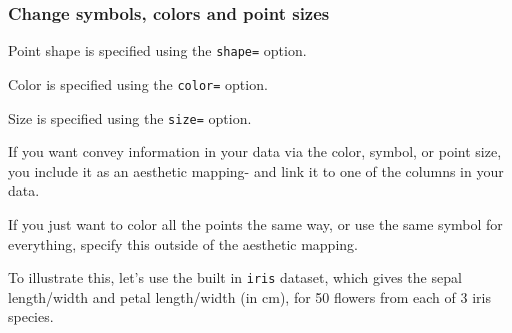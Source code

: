 \documentclass[
]{article}
\begin{document}
\hypertarget{change-symbols-colors-and-point-sizes}{%
\subsubsection{Change symbols, colors and point
sizes}\label{change-symbols-colors-and-point-sizes}}

Point shape is specified using the \texttt{shape=} option.

Color is specified using the \texttt{color=} option.

Size is specified using the \texttt{size=} option.

If you want convey information in your data via the color, symbol, or
point size, you include it as an aesthetic mapping- and link it to one
of the columns in your data.

If you just want to color all the points the same way, or use the same
symbol for everything, specify this outside of the aesthetic mapping.

To illustrate this, let's use the built in \texttt{iris} dataset, which
gives the sepal length/width and petal length/width (in cm), for 50
flowers from each of 3 iris species.
\end{document}
